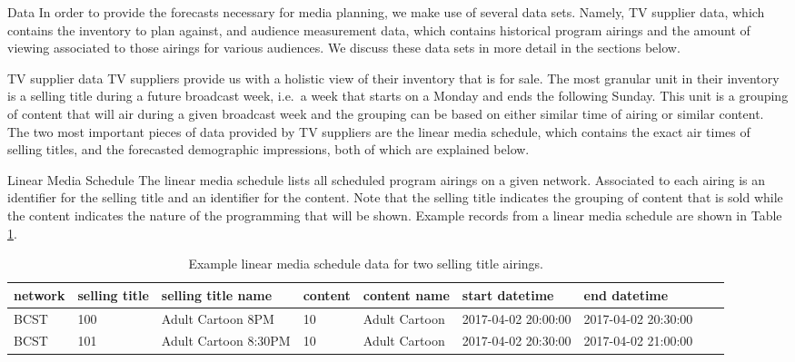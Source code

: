 \begin{chapter}{Data}\label{data}
  In order to provide the forecasts necessary for media planning, we make use
  of several data sets. Namely, TV supplier data, which contains the inventory to plan against, and
  audience measurement data, which contains historical program airings and the
  amount of viewing associated to those airings for various audiences. We discuss
  these data sets in more detail in the sections below.

\begin{section}{TV supplier data}
  TV suppliers provide us with a holistic view of their inventory that is for sale.
  The most granular unit in their inventory is a selling title during a future broadcast week, i.e.\ a
  week that starts on a Monday and ends the following Sunday. This
  unit is a grouping of content that will air during a given broadcast week and the grouping can be
  based on either similar time of airing or similar content. The two most important
  pieces of data provided by TV suppliers are the linear media schedule, which contains the exact air times of
  selling titles, and the forecasted demographic impressions, both of which are explained below.

  \begin{subsection}{Linear Media Schedule}
    The linear media schedule lists all scheduled program airings on a given network.
    Associated to each airing is an identifier for the selling title and an identifier for the content.
    Note that the selling title indicates the grouping of content that is sold while the content
    indicates the nature of the programming that will be shown. Example records
    from a linear media schedule are shown in Table \ref{tab:tvsched}.

    \begin{table}[h!]
      \centering
      \begin{adjustbox}{width=1.1\textwidth,center=\textwidth}
        \large
        \begin{tabular}{lllllllll}
          network & selling title & selling title name & content & content name & start datetime & end datetime \\
          \hline
          BCST & 100 & Adult Cartoon 8PM & 10 & Adult Cartoon & 2017-04-02 20:00:00 & 2017-04-02 20:30:00 \\
          BCST & 101 & Adult Cartoon 8:30PM & 10 & Adult Cartoon & 2017-04-02 20:30:00 & 2017-04-02 21:00:00 \\
        \end{tabular}
      \end{adjustbox}
      \caption{Example linear media schedule data for two selling title airings.}\label{tab:tvsched}
    \end{table}


\end{subsection}
\end{section}
\end{chapter}
